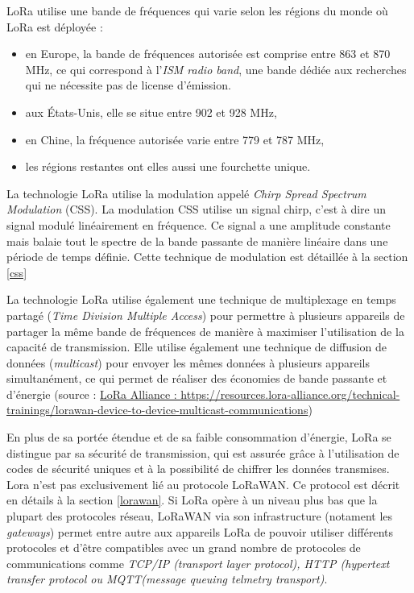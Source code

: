 \vspace{0.1cm}

LoRa utilise une bande de fréquences qui varie selon les régions du monde où LoRa est déployée :

\vspace{0.1cm}

\begin{itemize}
\item en Europe, la bande de fréquences autorisée est comprise entre 863 et 870 MHz, ce qui correspond à l'\textit{ISM radio band}, une bande dédiée aux recherches qui ne nécessite pas de license d'émission.
\item aux États-Unis, elle se situe entre 902 et 928 MHz,
\item en Chine, la fréquence autorisée varie entre 779 et 787 MHz,
\item les régions restantes ont elles aussi une fourchette unique.
\end{itemize}

\vspace{0.1cm}

La technologie LoRa utilise la modulation appelé \textit{Chirp Spread Spectrum Modulation} (CSS). La modulation CSS utilise un signal chirp, c'est à dire un signal modulé linéairement en fréquence. Ce signal a une amplitude constante mais balaie tout le spectre de la bande passante de manière linéaire dans une période de temps définie. Cette technique de modulation est détaillée à la section \ref{css}

\vspace{0.1cm}

La technologie LoRa utilise également une technique de multiplexage en temps partagé (\textit{Time Division Multiple Access}) pour permettre à plusieurs appareils de partager la même bande de fréquences de manière à maximiser l'utilisation de la capacité de transmission. Elle utilise également une technique de diffusion de données (\textit{multicast}) pour envoyer les mêmes données à plusieurs appareils simultanément, ce qui permet de réaliser des économies de bande passante et d'énergie (source : \href{https://resources.lora-alliance.org/technical-trainings/lorawan-device-to-device-multicast-communications}{LoRa Alliance : https://resources.lora-alliance.org/technical-trainings/lorawan-device-to-device-multicast-communications})

\vspace{0.1cm}

En plus de sa portée étendue et de sa faible consommation d'énergie, LoRa se distingue par sa sécurité de transmission, qui est assurée grâce à l'utilisation de codes de sécurité uniques et à la possibilité de chiffrer les données transmises. Lora n'est pas exclusivement lié au protocole LoRaWAN. Ce protocol est décrit en détails à la section \ref{lorawan}. Si LoRa opère à un niveau plus bas que la plupart des protocoles réseau, LoRaWAN via son infrastructure (notament les \textit{gateways}) permet entre autre aux appareils LoRa de pouvoir utiliser différents protocoles et d'être compatibles avec un grand nombre de protocoles de communications comme \textit{TCP/IP (transport layer protocol), HTTP (hypertext transfer protocol ou MQTT(message queuing telmetry transport)}.

